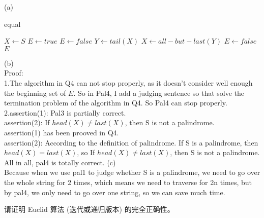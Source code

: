 \documentclass[a4paper, justified]{tufte-handout}
\begin{document}
\begin{solution}
  (a)\\
  \begin{algorithm}
    \caption{equal}
    \label{alg:sum}
    \begin{algorithmic}[2]
      \State $X \gets S$
      \State $E \gets true$
      \Else $E \gets false$
      \EndIf
      \State $Y \gets tail(X)$
      \State $ X \gets all-but-last(Y)$
      \Else $E \gets false$\\
      \EndIf
      \EndWhile
      \State \Return $E$
      \EndProcedure
    \end{algorithmic}
  \end{algorithm}
  (b)\\
  Proof:\\
  1.The algorithm in Q4 can not stop properly, as it doesn't consider well enough the beginning set of $E$. So in Pal4, I add a judging sentence so that solve the termination problem of the algorithm in Q4. So Pal4 can stop properly.\\
  2.assertion(1): Pal3 is partially correct.\\
  assertion(2): If $head(X) \neq last(X)$, then S is not a palindrome.\\
  assertion(1) has been prooved in Q4.\\
  assertion(2): According to the definition of palindrome. If S is a palindrome, then $head(X) = last(X)$, so If $head(X) \neq last(X)$, then S is not a palindrome.\\
  All in all, pal4 is totally correct.
  (c)\\
  Because when we use pal1 to judge whether S is a palindrome, we need to go over the whole string for 2 times, which means we need to traverse for 2n times, but by pal4, we only need to go over one string, so we can save much time.

\end{solution}

\beginoptional

\begin{problem}
请证明 Euclid 算法 (迭代或递归版本) 的完全正确性。
\end{problem}

\begin{solution}
\end{solution}
\end{document}
